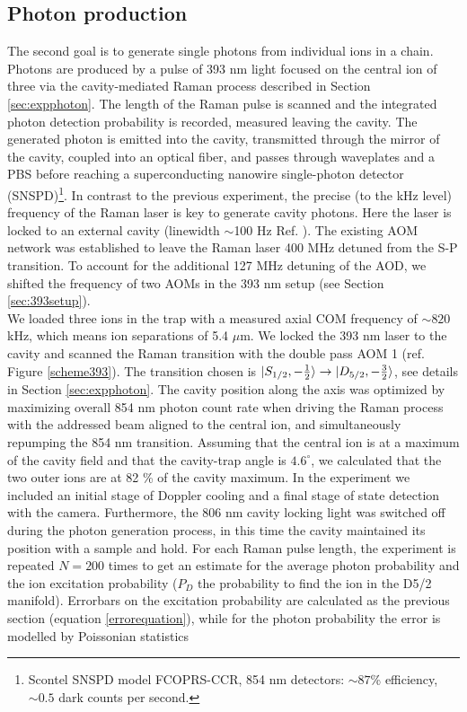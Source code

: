 \subsection{Photon production}
\label{exp:photons}
The second goal is to generate single photons from individual ions in a chain. Photons are produced by a pulse of 393 nm light focused on the central ion of three via the cavity-mediated Raman process described in Section \ref{sec:expphoton}. The length of the Raman pulse is scanned and the integrated photon detection probability is recorded, measured leaving the cavity. The generated photon is emitted into the cavity, transmitted through the mirror of the cavity, coupled into an optical fiber, and passes through waveplates and a PBS before reaching a superconducting nanowire single-photon detector (SNSPD)\footnote{Scontel SNSPD model FCOPRS-CCR, 854 nm detectors: $\sim 87$\% efficiency, $\sim 0.5$ dark counts per second.}. In contrast to the previous experiment, the precise (to the kHz level) frequency of the Raman laser is key to generate cavity photons. Here the laser is locked to an external cavity (linewidth $\sim$100 Hz Ref. \cite{helene}). The existing AOM network was established to leave the Raman laser 400 MHz detuned from the S-P transition. To account for the additional 127 MHz detuning of the AOD, we shifted the frequency of two AOMs in the 393 nm setup (see Section \ref{sec:393setup}).\\
We loaded three ions in the trap with a measured axial COM frequency of $\sim 820$ kHz, which means ion separations of 5.4 $\mu$m. We locked the 393 nm laser to the cavity and scanned the Raman transition with the double pass AOM 1 (ref. Figure \ref{scheme393}). The transition chosen is $\ket{S_{1/2},-\frac{1}{2}}\to \ket{D_{5/2},-\frac{3}{2}}$, see details in Section \ref{sec:expphoton}. The cavity position along the axis was optimized by maximizing overall 854 nm photon count rate when driving the Raman process with the addressed beam aligned to the central ion, and simultaneously repumping the 854 nm transition. Assuming that the central ion is at a maximum of the cavity field and that the cavity-trap angle is $4.6^\circ$, we calculated that the two outer ions are at 82 \% of the cavity maximum.
In the experiment we included an initial stage of Doppler cooling and a final stage of state detection with the camera. Furthermore, the 806 nm cavity locking light was switched off during the photon generation process, in this time the cavity maintained its position with a sample and hold. For each Raman pulse length, the experiment is repeated $N=200$ times to get an estimate for the average photon probability and the ion excitation probability ($P_D$ the probability to find the ion in the D5/2 manifold). Errorbars on the excitation probability are calculated as the previous section (equation \eqref{errorequation}), while for the photon probability the error is modelled by Poissonian statistics \cite{quantumoptics}
